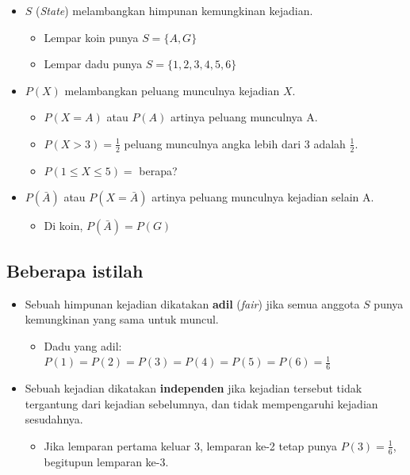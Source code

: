 \documentclass[
  letterpaper,
  DIV=11,
  numbers=noendperiod]{scrartcl}
\providecommand{\tightlist}{%
  \setlength{\itemsep}{0pt}\setlength{\parskip}{0pt}}\usepackage{longtable,booktabs,array}
\begin{document}
\begin{itemize}
\item
  \(S\) (\emph{State}) melambangkan himpunan kemungkinan kejadian.

  \begin{itemize}
  \item
    Lempar koin punya \(S=\{A,G\}\)
  \item
    Lempar dadu punya \(S=\{1,2,3,4,5,6\}\)
  \end{itemize}
\item
  \(P(X)\) melambangkan peluang munculnya kejadian \(X\).

  \begin{itemize}
  \item
    \(P(X=A)\) atau \(P(A)\) artinya peluang munculnya A.
  \item
    \(P(X>3)=\frac{1}{2}\) peluang munculnya angka lebih dari 3 adalah
    \(\frac{1}{2}\).
  \item
    \(P(1\leq X \leq 5)=\) berapa?
  \end{itemize}
\item
  \(P(\bar{A})\) atau \(P(X=\bar{A})\) artinya peluang munculnya
  kejadian selain A.

  \begin{itemize}
  \tightlist
  \item
    Di koin, \(P(\bar{A})=P(G)\)
  \end{itemize}
\end{itemize}

\subsection{Beberapa istilah}\label{beberapa-istilah}

\begin{itemize}
\item
  Sebuah himpunan kejadian dikatakan \textbf{adil} (\emph{fair}) jika
  semua anggota \(S\) punya kemungkinan yang sama untuk muncul.

  \begin{itemize}
  \tightlist
  \item
    Dadu yang adil: \(P(1)=P(2)=P(3)=P(4)=P(5)=P(6)=\frac{1}{6}\)
  \end{itemize}
\item
  Sebuah kejadian dikatakan \textbf{independen} jika kejadian tersebut
  tidak tergantung dari kejadian sebelumnya, dan tidak mempengaruhi
  kejadian sesudahnya.

  \begin{itemize}
  \tightlist
  \item
    Jika lemparan pertama keluar 3, lemparan ke-2 tetap punya
    \(P(3)=\frac{1}{6}\), begitupun lemparan ke-3.
  \end{itemize}
\end{itemize}
\end{document}
